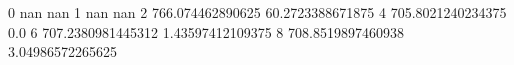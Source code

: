 0 nan nan
1 nan nan
2 766.074462890625 60.2723388671875
4 705.8021240234375 0.0
6 707.2380981445312 1.43597412109375
8 708.8519897460938 3.04986572265625

